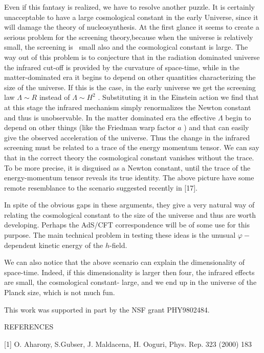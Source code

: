 \documentclass[a4paper,12pt]{article}
\begin{document}
Even if this fantasy is realized, we have to resolve another puzzle. It is
certainly unacceptable to have a large cosmological constant in the early
Universe, since it will damage the theory of nucleosynthesis. At the first
glance it seems to create a serious problem for the screening theory,because
when the universe is relatively small, the screening is \ small also and the
cosmological constant is large. The way out of this problem is to conjecture
that in the radiation dominated universe the infrared cut-off is provided by
the curvature of space-time, while in the matter-dominated era it begins to
depend on other quantities characterizing the size of the universe. If this
is the case, in the early universe we get the screening law $\Lambda \sim R$
instead of $\Lambda \sim H^{2}$ . Substituting it in the Einstein action we
find that at this stage the infrared mechanism simply renormalizes the
Newton constant and thus is unobservable. In the matter dominated era the
effective $\Lambda $ begin to depend on other things (like the Friedman warp
factor $a$ ) and that can easily give the observed acceleration of the
universe. Thus the change in the infrared screening must be related to a
trace of the energy momentum tensor. We can say that in the correct theory
the cosmological constant vanishes without the trace. To be more precise, it
is disguised as a Newton constant, until the trace of the energy-momentum
tensor reveals its true identity. The above picture have some remote
resemblance to the scenario suggested recently in [17].

In spite of the obvious gaps in these arguments, they give a very natural
way of relating the cosmological constant to the size of the universe and
thus are worth developing. Perhaps the AdS/CFT correspondence will be of
some use for this purpose. The main technical problem in testing these ideas
is the unusual $\varphi -$ dependent kinetic energy of the $h$-field.

We can also notice that the above scenario can explain the dimensionality of
space-time. Indeed, if this dimensionality is larger then four, the infrared
effects are small, the cosmological constant- large, and we end up in the
universe of the Planck size, which is not much fun.

This work was supported in part by the NSF grant PHY9802484.

\newpage

REFERENCES

[1] O. Aharony, S.Gubser, J. Maldacena, H. Ooguri, Phys. Rep. 323
(2000) 183
\end{document}
